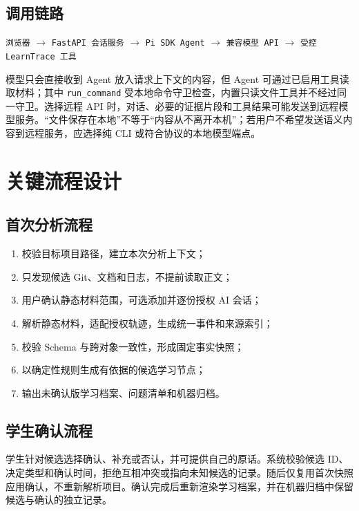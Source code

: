 \documentclass[UTF8,a4paper,12pt]{ctexart}
\begin{document}
\subsection{调用链路}

\begin{center}
\small
\texttt{浏览器}
$\rightarrow$
\texttt{FastAPI 会话服务}
$\rightarrow$
\texttt{Pi SDK Agent}
$\rightarrow$
\texttt{兼容模型 API}
$\rightarrow$
\texttt{受控 LearnTrace 工具}
\end{center}

模型只会直接收到 Agent 放入请求上下文的内容，但 Agent 可通过已启用工具读取材料；其中 \texttt{run\_command} 受本地命令守卫检查，内置只读文件工具并不经过同一守卫。选择远程 API 时，对话、必要的证据片段和工具结果可能发送到远程模型服务。“文件保存在本地”不等于“内容从不离开本机”；若用户不希望发送语义内容到远程服务，应选择纯 CLI 或符合协议的本地模型端点。

\section{关键流程设计}

\subsection{首次分析流程}

\begin{enumerate}
  \item 校验目标项目路径，建立本次分析上下文；
  \item 只发现候选 Git、文档和日志，不提前读取正文；
  \item 用户确认静态材料范围，可选添加并逐份授权 AI 会话；
  \item 解析静态材料，适配授权轨迹，生成统一事件和来源索引；
  \item 校验 Schema 与跨对象一致性，形成固定事实快照；
  \item 以确定性规则生成有依据的候选学习节点；
  \item 输出未确认版学习档案、问题清单和机器归档。
\end{enumerate}

\subsection{学生确认流程}

学生针对候选选择确认、补充或否认，并可提供自己的原话。系统校验候选 ID、决定类型和确认时间，拒绝互相冲突或指向未知候选的记录。随后仅复用首次快照应用确认，不重新解析项目。确认完成后重新渲染学习档案，并在机器归档中保留候选与确认的独立记录。
\end{document}
